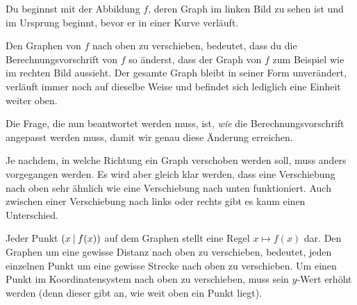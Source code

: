 \documentclass[../../main.tex]{subfiles}
\begin{document}
\begin{example}{}
    \begin{minipage}{\textwidth}
        Du beginnst mit der Abbildung $f$, deren Graph im linken Bild zu sehen ist und im Ursprung beginnt, bevor er in einer Kurve verläuft.
        
        Den Graphen von $f$ nach oben zu verschieben, bedeutet, dass du die Berechnungsvorschrift von $f$ so änderst, dass der Graph von $f$ zum Beispiel wie im rechten Bild aussieht. Der gesamte Graph bleibt in seiner Form unverändert, verläuft immer noch auf dieselbe Weise und befindet sich lediglich eine Einheit weiter oben.
        \begin{multicols}{2}\centering
            
        \end{multicols}
        
        Die Frage, die nun beantwortet werden muss, ist, \emph{wie} die Berechnungsvorschrift angepasst werden muss, damit wir genau diese Änderung erreichen.
    \end{minipage}
\end{example}

Je nachdem, in welche Richtung ein Graph verschoben werden soll, muss anders vorgegangen werden. Es wird aber gleich klar werden, dass eine Verschiebung nach oben sehr ähnlich wie eine Verschiebung nach unten funktioniert. Auch zwischen einer Verschiebung nach links oder rechts gibt es kaum einen Unterschied.

Jeder Punkt $\left(x \:\middle|\: f(x)\right)$ auf dem Graphen stellt eine Regel $x\mapsto f(x)$ dar. Den Graphen um eine gewisse Distanz nach oben zu verschieben, bedeutet, jeden einzelnen Punkt um eine gewisse Strecke nach oben zu verschieben. Um einen Punkt im Koordinatensystem nach oben zu verschieben, muss sein $y$-Wert erhöht werden (denn dieser gibt an, wie weit oben ein Punkt liegt).
\end{document}
